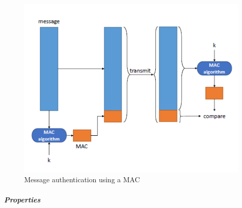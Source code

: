 \documentclass{article}
\begin{document}
                                    \begin{figure}[h]
                                        \begin{center}
                                            \includegraphics{../immagini/MAC.png}
                                        \end{center}
                                        \caption{Message
                                        authentication
                                        using a MAC}
                                    \end{figure}
                                    \subparagraph{Properties}
\end{document}
